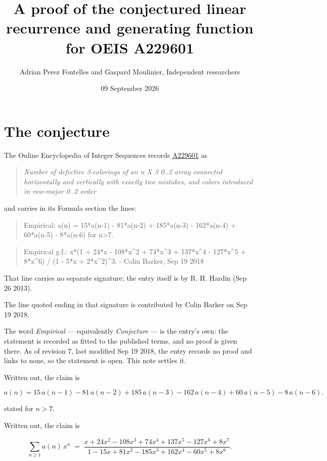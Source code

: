 \documentclass[11pt]{article}
\title{A proof of the conjectured linear recurrence and generating function for OEIS A229601}
\author{Adrian Perez Fontelles and Gaspard Moulinier, Independent researchers}
\date{09 September 2026}
\theoremstyle{definition}
\begin{document}
\maketitle
\section{The conjecture}

The Online Encyclopedia of Integer Sequences records \href{https://oeis.org/A229601}{A229601} as

\begin{quote}\itshape Number of defective 3-colorings of an n X 3 0..2 array connected horizontally and vertically with exactly two mistakes, and colors introduced in row-major 0..2 order\end{quote}

and carries in its Formula section the lines:

\begin{quote}\ttfamily Empirical: a(n) = 15*a(n-1) - 81*a(n-2) + 185*a(n-3) - 162*a(n-4) + 60*a(n-5) - 8*a(n-6) for n>7.\end{quote}

\begin{quote}\ttfamily Empirical g.f.: x*(1 + 24*x - 108*x\textasciicircum{}2 + 74*x\textasciicircum{}3 + 137*x\textasciicircum{}4 - 127*x\textasciicircum{}5 + 8*x\textasciicircum{}6) / (1 - 5*x + 2*x\textasciicircum{}2)\textasciicircum{}3. - Colin Barker, Sep 19 2018\end{quote}

That line carries no separate signature; the entry itself is by R. H. Hardin (Sep 26 2013).

The line quoted ending in that signature is contributed by Colin Barker on Sep 19 2018.

The word {\itshape Empirical} --- equivalently {\itshape Conjecture} --- is the entry's own: the statement is recorded as fitted to the published terms, and no proof is given there. As of revision 7, last modified Sep 19 2018, the entry records no proof and links to none, so the statement is open. This note settles it.

Written out, the claim is

\[a(n) = 15\,a(n-1) - 81\,a(n-2) + 185\,a(n-3) - 162\,a(n-4) + 60\,a(n-5) - 8\,a(n-6).\]

stated for $n > 7$.

Written out, the claim is

\[\sum_{n \ge 1} a(n)\,x^n \;=\; \frac{x + 24x^{2} - 108x^{3} + 74x^{4} + 137x^{5} - 127x^{6} + 8x^{7}}{1 - 15x + 81x^{2} - 185x^{3} + 162x^{4} - 60x^{5} + 8x^{6}}.\]
\end{document}
